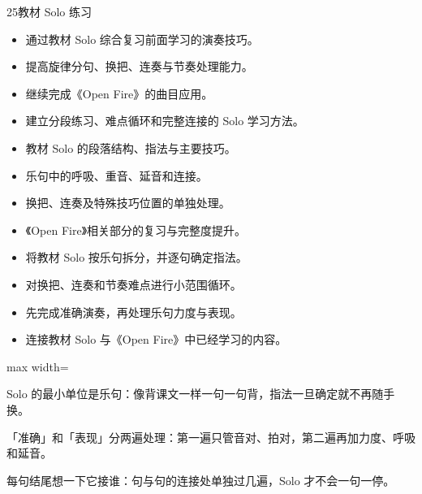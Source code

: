 \begin{lessoncard}{25}{教材 Solo 练习}
\begin{itemize}
\item 通过教材 Solo 综合复习前面学习的演奏技巧。
\item 提高旋律分句、换把、连奏与节奏处理能力。
\item 继续完成《Open Fire》的曲目应用。
\item 建立分段练习、难点循环和完整连接的 Solo 学习方法。
\end{itemize}
\begin{itemize}
\item 教材 Solo 的段落结构、指法与主要技巧。
\item 乐句中的呼吸、重音、延音和连接。
\item 换把、连奏及特殊技巧位置的单独处理。
\item 《Open Fire》相关部分的复习与完整度提升。
\end{itemize}
\begin{itemize}
\item 将教材 Solo 按乐句拆分，并逐句确定指法。
\item 对换把、连奏和节奏难点进行小范围循环。
\item 先完成准确演奏，再处理乐句力度与表现。
\item 连接教材 Solo 与《Open Fire》中已经学习的内容。
\end{itemize}
\begin{fignote}
\begin{center}
\begin{adjustbox}{max width=\textwidth}
\steparrow
{}\steparrow
{}\steparrow
{}\steparrow
{}
\end{adjustbox}
\end{center}
\begin{fignotes}
\item Solo 的最小单位是乐句：像背课文一样一句一句背，指法一旦确定就不再随手换。
\item 「准确」和「表现」分两遍处理：第一遍只管音对、拍对，第二遍再加力度、呼吸和延音。
\item 每句结尾想一下它接谁：句与句的连接处单独过几遍，Solo 才不会一句一停。
\end{fignotes}
\end{fignote}
\end{lessoncard}

